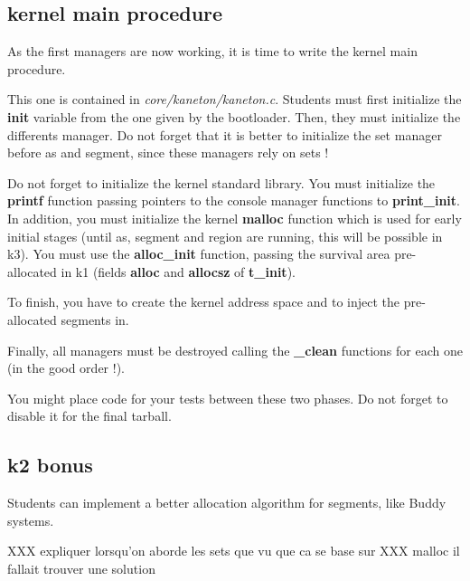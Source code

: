 %
%

\subsection{kernel main procedure}

As the first managers are now  working, it is time to write the kernel
main procedure.

This  one is  contained  in \textit{core/kaneton/kaneton.c}.  Students
must first initialize the \textbf{init} variable from the one given by
the bootloader. Then, they  must initialize the differents manager. Do
not forget that  it is better to initialize the  set manager before as
and segment, since these managers rely on sets !

Do not  forget to  initialize the kernel  standard library.   You must
initialize  the  \textbf{printf}  function  passing  pointers  to  the
console  manager functions to  \textbf{print\_init}. In  addition, you
must initialize the kernel  \textbf{malloc} function which is used for
early initial stages  (until as, segment and region  are running, this
will  be  possible  in  k3).  You must  use  the  \textbf{alloc\_init}
function,  passing  the  survival   area  pre-allocated  in  k1  (fields
\textbf{alloc} and \textbf{allocsz} of \textbf{t\_init}).

To finish, you  have to create the kernel address  space and to inject
the pre-allocated segments in.

Finally, all  managers must be destroyed  calling the \textbf{\_clean}
functions for each one (in the good order !).

You might place  code for your tests between these  two phases. Do not
forget to disable it for the final tarball.

%
%

\subsection{k2 bonus}

Students can implement a better allocation algorithm for
segments, like Buddy systems.


XXX expliquer lorsqu'on aborde les sets que vu que ca se base sur
XXX malloc il fallait trouver une solution
